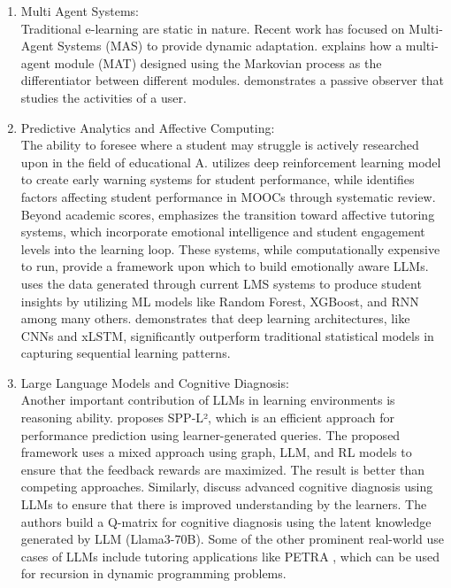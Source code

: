 \documentclass[conference]{IEEEtran}
\begin{document}
\begin{enumerate}
	\item Multi Agent Systems: \\
	Traditional e-learning are static in nature. Recent work has focused on Multi-Agent Systems (MAS) to provide dynamic adaptation. \textcite{zakaria2025} explains how a multi-agent module (MAT) designed using the Markovian process as the differentiator between different modules. \textcite{vukovic2021} demonstrates a passive observer that studies the activities of a user.
	
	\item Predictive Analytics and Affective Computing: \\
	The ability to foresee where a student may struggle is actively researched upon in the field of educational A. \textcite{bagunaid2024} utilizes deep reinforcement learning model to create early warning systems for student performance, while \textcite{rizwan2025} identifies factors affecting student performance in MOOCs through systematic review. Beyond academic scores, \textcite{hasan2020} emphasizes the transition toward affective tutoring systems, which incorporate emotional intelligence and student engagement levels \cite{ayouni2021} into the learning loop. These systems, while computationally expensive to run, provide a framework upon which to build emotionally aware LLMs. 
	\textcite{mahafdah2024} uses the data generated through current LMS systems to produce student insights by utilizing ML models like Random Forest, XGBoost, and RNN among many others. \textcite{aderghal2025} demonstrates that deep learning architectures, like CNNs and xLSTM, significantly outperform traditional statistical models in capturing sequential learning patterns.
	
	\item Large Language Models and Cognitive Diagnosis: \\
	Another important contribution of LLMs in learning environments is reasoning ability. \textcite{zhang2025} proposes SPP-L², which is an efficient approach for performance prediction using learner-generated queries. The proposed framework uses a mixed approach using graph, LLM, and RL models to ensure that the feedback rewards are maximized. The result is better than competing approaches. Similarly, \textcite{chen2025} discuss advanced cognitive diagnosis using LLMs to ensure that there is improved understanding by the learners. The authors build a Q-matrix for cognitive diagnosis using the latent knowledge generated by LLM (Llama3-70B). Some of the other prominent real-world use cases of LLMs include tutoring applications like PETRA \cite{hewedy2025}, which can be used for recursion in dynamic programming problems.
	

\end{enumerate}
\end{document}
